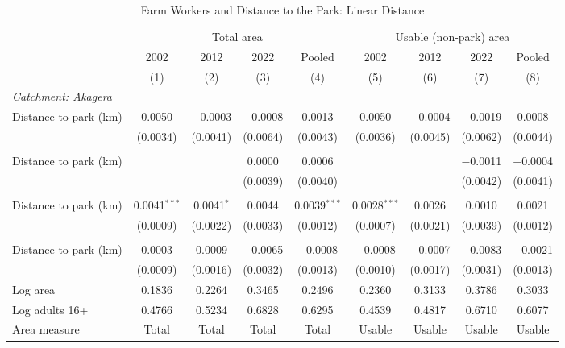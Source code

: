 \documentclass[11pt]{article}
\begin{document}
\begin{table}[H]
\centering\footnotesize\setlength{\tabcolsep}{4pt}
\caption{Farm Workers and Distance to the Park: Linear Distance}
\label{tab:dist_linear_farm}
\begin{adjustbox}{max width=\textwidth, max totalheight=0.8\textheight}
\begin{tabular}{lcccccccc}
\toprule
 & \multicolumn{4}{c}{Total area} & \multicolumn{4}{c}{Usable (non-park) area} \\
\cmidrule(lr){2-5} \cmidrule(lr){6-9}
 & 2002 & 2012 & 2022 & Pooled & 2002 & 2012 & 2022 & Pooled \\
 & (1) & (2) & (3) & (4) & (5) & (6) & (7) & (8) \\
\midrule
\multicolumn{9}{l}{\textit{Catchment: Akagera}} \\
\quad Distance to park (km) & 0.0050 & $-$0.0003 & $-$0.0008 & 0.0013 & 0.0050 & $-$0.0004 & $-$0.0019 & 0.0008 \\
 & (0.0034) & (0.0041) & (0.0064) & (0.0043) & (0.0036) & (0.0045) & (0.0062) & (0.0044) \\
\addlinespace
\multicolumn{9}{l}{\textit{Catchment: Gishwati--Mukura}} \\
\quad Distance to park (km) &  &  & 0.0000 & 0.0006 &  &  & $-$0.0011 & $-$0.0004 \\
 &  &  & (0.0039) & (0.0040) &  &  & (0.0042) & (0.0041) \\
\addlinespace
\multicolumn{9}{l}{\textit{Catchment: Nyungwe}} \\
\quad Distance to park (km) & 0.0041$^{***}$ & 0.0041$^{*}$ & 0.0044 & 0.0039$^{***}$ & 0.0028$^{***}$ & 0.0026 & 0.0010 & 0.0021 \\
 & (0.0009) & (0.0022) & (0.0033) & (0.0012) & (0.0007) & (0.0021) & (0.0039) & (0.0012) \\
\addlinespace
\multicolumn{9}{l}{\textit{Catchment: Volcanoes}} \\
\quad Distance to park (km) & 0.0003 & 0.0009 & $-$0.0065 & $-$0.0008 & $-$0.0008 & $-$0.0007 & $-$0.0083 & $-$0.0021 \\
 & (0.0009) & (0.0016) & (0.0032) & (0.0013) & (0.0010) & (0.0017) & (0.0031) & (0.0013) \\
\addlinespace
\midrule
Log area & 0.1836 & 0.2264 & 0.3465 & 0.2496 & 0.2360 & 0.3133 & 0.3786 & 0.3033 \\
Log adults 16+ & 0.4766 & 0.5234 & 0.6828 & 0.6295 & 0.4539 & 0.4817 & 0.6710 & 0.6077 \\
Area measure & Total & Total & Total & Total & Usable & Usable & Usable & Usable \\

\end{tabular}
\end{adjustbox}
\end{table}
\end{document}
